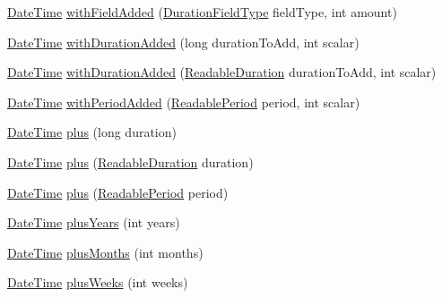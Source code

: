 \begin{DoxyCompactItemize}
\item 
\hyperlink{classorg_1_1joda_1_1time_1_1_date_time}{Date\-Time} \hyperlink{classorg_1_1joda_1_1time_1_1_date_time_a9bab96dcca5a777d54d00cec90421d1c}{with\-Field\-Added} (\hyperlink{classorg_1_1joda_1_1time_1_1_duration_field_type}{Duration\-Field\-Type} field\-Type, int amount)
\item 
\hyperlink{classorg_1_1joda_1_1time_1_1_date_time}{Date\-Time} \hyperlink{classorg_1_1joda_1_1time_1_1_date_time_a15014b9b13456bb890f39e5400776313}{with\-Duration\-Added} (long duration\-To\-Add, int scalar)
\item 
\hyperlink{classorg_1_1joda_1_1time_1_1_date_time}{Date\-Time} \hyperlink{classorg_1_1joda_1_1time_1_1_date_time_ac38aaf4c4885f3d3cb5bf1f438c9a4c2}{with\-Duration\-Added} (\hyperlink{interfaceorg_1_1joda_1_1time_1_1_readable_duration}{Readable\-Duration} duration\-To\-Add, int scalar)
\item 
\hyperlink{classorg_1_1joda_1_1time_1_1_date_time}{Date\-Time} \hyperlink{classorg_1_1joda_1_1time_1_1_date_time_a046b60083b52025ef0b28ba723f6e4b1}{with\-Period\-Added} (\hyperlink{interfaceorg_1_1joda_1_1time_1_1_readable_period}{Readable\-Period} period, int scalar)
\item 
\hyperlink{classorg_1_1joda_1_1time_1_1_date_time}{Date\-Time} \hyperlink{classorg_1_1joda_1_1time_1_1_date_time_a23939d00e3fbadf840c69ec3c4944166}{plus} (long duration)
\item 
\hyperlink{classorg_1_1joda_1_1time_1_1_date_time}{Date\-Time} \hyperlink{classorg_1_1joda_1_1time_1_1_date_time_a62d7c090576a531d59bc3ff08abad587}{plus} (\hyperlink{interfaceorg_1_1joda_1_1time_1_1_readable_duration}{Readable\-Duration} duration)
\item 
\hyperlink{classorg_1_1joda_1_1time_1_1_date_time}{Date\-Time} \hyperlink{classorg_1_1joda_1_1time_1_1_date_time_a196058e85f71dff818d5eb593415b345}{plus} (\hyperlink{interfaceorg_1_1joda_1_1time_1_1_readable_period}{Readable\-Period} period)
\item 
\hyperlink{classorg_1_1joda_1_1time_1_1_date_time}{Date\-Time} \hyperlink{classorg_1_1joda_1_1time_1_1_date_time_a0b451840f6820f1b4d6b6876aef5905a}{plus\-Years} (int years)
\item 
\hyperlink{classorg_1_1joda_1_1time_1_1_date_time}{Date\-Time} \hyperlink{classorg_1_1joda_1_1time_1_1_date_time_a9a225a8891df00a2136a0ded57de9314}{plus\-Months} (int months)
\item 
\hyperlink{classorg_1_1joda_1_1time_1_1_date_time}{Date\-Time} \hyperlink{classorg_1_1joda_1_1time_1_1_date_time_ab5d31946df83453c2a46f5a17a47ba38}{plus\-Weeks} (int weeks)

\end{DoxyCompactItemize}
